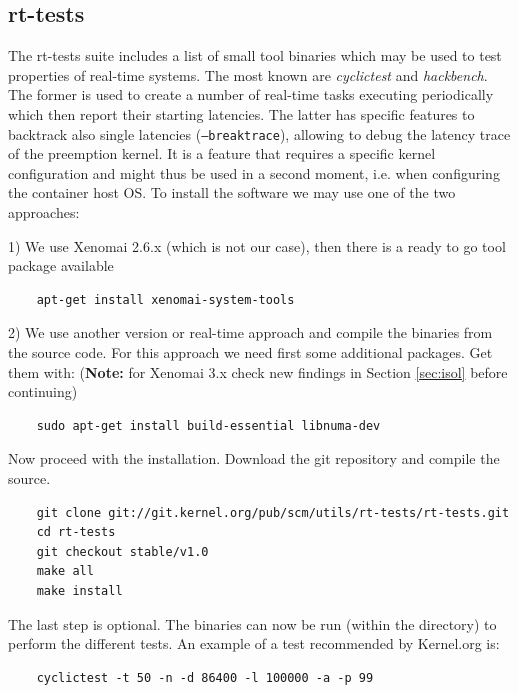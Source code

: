\documentclass[]{scrartcl}
\begin{document}
\subsection{rt-tests}

The rt-tests suite includes a list of small tool binaries which may be used to test properties of real-time systems. The most known are \textit{cyclictest} and \textit{hackbench}.
The former is used to create a number of real-time tasks executing periodically which then report their starting latencies. 
The latter has specific features to backtrack also single latencies (\texttt{--breaktrace}), allowing to debug the latency trace of the preemption kernel. It is a feature that requires a specific kernel configuration and might thus be used in a second moment, i.e. when configuring the container host OS. To install the software we may use one of the two approaches:

1) We use Xenomai 2.6.x (which is not our case), then there is a ready to go tool package available

\begin{verbatim}
	apt-get install xenomai-system-tools
\end{verbatim}

2) We use another version or real-time approach and compile the binaries from the source code.
For this approach we need first some additional packages. Get them with: (\textbf{Note:} for Xenomai 3.x check new findings in Section \ref{sec:isol} before continuing)

\begin{verbatim}
	sudo apt-get install build-essential libnuma-dev
\end{verbatim}

Now proceed with the installation. Download the git repository and compile the source.

\begin{verbatim}
	git clone git://git.kernel.org/pub/scm/utils/rt-tests/rt-tests.git
	cd rt-tests
	git checkout stable/v1.0
	make all
	make install
\end{verbatim}

The last step is optional. The binaries can now be run (within the directory) to perform the different tests. An example of a test recommended by Kernel.org is: 

\begin{verbatim}
	cyclictest -t 50 -n -d 86400 -l 100000 -a -p 99
\end{verbatim}
\end{document}
